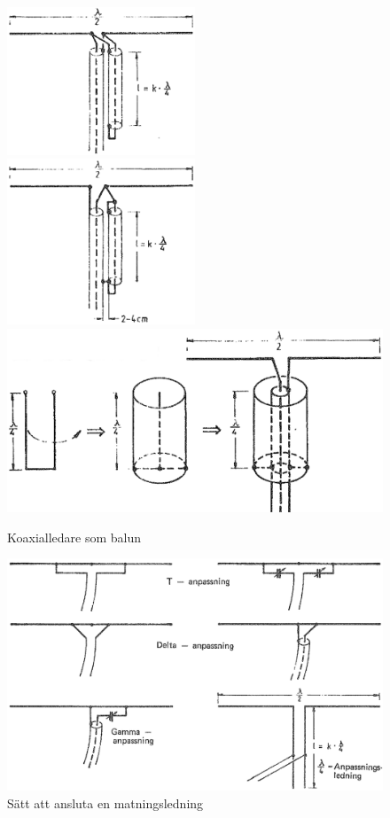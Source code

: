 \begin{figure}
  \includegraphics[width=0.5\textwidth]{images/cropped_pdfs/bild_2_6-30_1.pdf}
  \includegraphics[width=0.5\textwidth]{images/cropped_pdfs/bild_2_6-30_2.pdf}
  \includegraphics[width=\textwidth]{images/cropped_pdfs/bild_2_6-30_3.pdf}
  \caption{Koaxialledare som balun}
  \label{fig:bildII6-30}
\end{figure}

\begin{figure}
  \includegraphics[width=\textwidth]{images/cropped_pdfs/bild_2_6-31.pdf}
  \caption{Sätt att ansluta en matningsledning}
  \label{fig:bildII6-31}
\end{figure}

